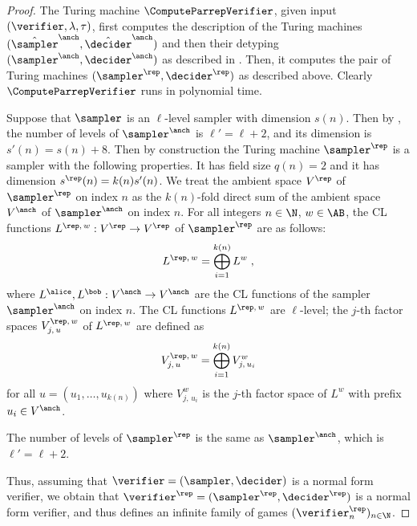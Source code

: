 \begin{proof}

The Turing machine $\ComputeParrepVerifier$, given input $(\verifier,\lambda,\tau)$, first
computes the description of the Turing machines $(\tsanch,\tdanch)$ and then their detyping $(\sanch,\danch)$ 
as described in . Then, it computes the pair of Turing machines $(\sampler^\rep,\decider^\rep)$ as described above. 
Clearly $\ComputeParrepVerifier$ runs in polynomial time. 


Suppose that $\sampler$ is an $\ell$-level sampler with dimension $s(n)$. Then by , the number of levels of $\sanch$ is $\ell' = \ell+2$, and its dimension is $s'(n) = s(n)+8$. Then by construction the Turing machine $\sampler^\rep$ is a sampler with the following properties. It has field size $q(n) = 2$ 
and it has dimension $s^\rep(n) = k(n) s'(n)$.
We treat the ambient space $V^\rep$ of $\sampler^\rep$ on index $n$ as the
$k(n)$-fold direct sum of the ambient space $V^\anch$ of $\sanch$ on index $n$.
For all integers $n \in \N$, $w \in \AB$, the CL functions $L^{\rep,\,
  w}: V^\rep \to V^\rep$ of $\sampler^\rep$ are as follows:
\begin{equation*}
	L^{\rep,\, w} = \bigoplus_{i = 1}^{k(n)} L^w\;,
\end{equation*}
where $L^\alice,L^\bob:V^\anch \to V^\anch$ are the CL functions of the sampler $\sampler^\anch$
on index $n$. The CL functions $L^{\rep,\, w}$ are $\ell$-level; the $j$-th
factor spaces $V^{\rep,\, w}_{j,\, u}$ of $L^{\rep,\, w}$ are defined as
\begin{equation*}
	V^{\rep,\, w}_{j,\, u} = \bigoplus_{i = 1}^{k(n)} V^w_{j,\, u_i}
\end{equation*}
for all $u = (u_1,\ldots,u_{k(n)})$ where $V^w_{j,\, u_i}$ is the $j$-th factor
space of $L^w$ with prefix $u_i \in V^\anch$.







The number of levels of $\sampler^\rep$ is the same as $\sanch$, which is $\ell' = \ell + 2$. 

Thus, assuming that $\verifier = (\sampler,\decider)$ is a normal form verifier, we obtain that $\verifier^\rep = (\sampler^\rep,\decider^\rep)$ is a normal form verifier, and thus defines an infinite family of games $(\verifier_n^\rep)_{n \in \N}$. 




\end{proof}
